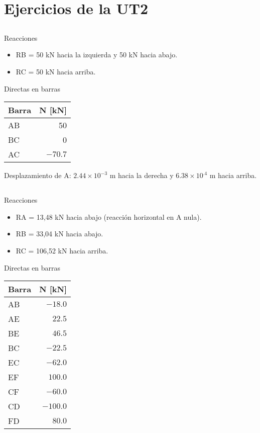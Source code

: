 \section{Ejercicios de la UT2}




\subsection{}

%
Reacciones
\begin{itemize}
\item RB = 50 kN hacia la izquierda y 50 kN hacia abajo.
\item RC = 50 kN hacia arriba.
\end{itemize}


Directas en barras
\begin{center}
\begin{tabular}{lr}
\hline
Barra & N [kN] \\
\hline
AB & 50 \\
BC & 0 \\
AC & $-70.7$\\
\hline
\end{tabular}
\end{center}

Desplazamiento de A: $2.44 \times  10^{-3}$ m hacia la derecha y $6.38 \times 10^{.4}$ m hacia arriba.


\subsection{}

Reacciones
\begin{itemize}
\item RA = 13,48 kN hacia abajo (reacción horizontal en A nula).
\item RB = 33,04 kN hacia abajo.
\item  RC = 106,52 kN hacia arriba.
\end{itemize}

Directas en barras
\begin{center}
	\begin{tabular}{lr}
		\hline
Barra & N [kN] \\
\hline
AB & $-18.0$ \\
AE & $22.5$ \\
BE & $46.5$ \\
BC & $-22.5$ \\
EC & $-62.0$ \\
EF & $100.0$ \\
CF & $-60.0$ \\
CD & $-100.0$ \\
FD & $80.0$ \\
\hline
\end{tabular}
\end{center}

